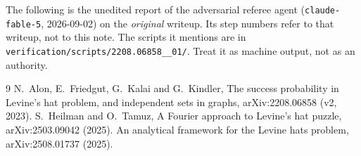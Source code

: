 \documentclass[11pt,a4paper]{article}
\theoremstyle{plain}
\theoremstyle{definition}
\theoremstyle{remark}
\begin{document}
\begin{tcolorbox}[colback=gray!8,colframe=gray!50,boxrule=0.4pt,arc=2pt]
\small The following is the unedited report of the adversarial referee agent (\texttt{claude-fable-5}, 2026-09-02) on the \emph{original} writeup. Its step numbers refer to that writeup, not to this note. The scripts it mentions are in \texttt{verification/scripts/2208.06858\_\_01/}. Treat it as machine output, not as an authority.
\end{tcolorbox}



\begin{thebibliography}{9}
 N.~Alon, E.~Friedgut, G.~Kalai and G.~Kindler, The success probability in Levine's hat problem, and independent sets in graphs, arXiv:2208.06858 (v2, 2023).
 S.~Heilman and O.~Tamuz, A Fourier approach to Levine's hat puzzle, arXiv:2503.09042 (2025).
 An analytical framework for the Levine hats problem, arXiv:2508.01737 (2025).
\end{thebibliography}
\end{document}
